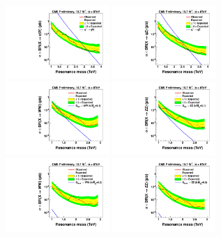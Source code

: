 \begin{figure}[h!tpb]
\begin{center}
\includegraphics[width=0.35\textwidth]{figs/limits/brazilianFlag_qW_combined.pdf}
\includegraphics[width=0.35\textwidth]{figs/limits/brazilianFlag_qZ_combined.pdf}\\
\includegraphics[width=0.35\textwidth]{figs/limits/brazilianFlag_RS1WW_combined.pdf}
\includegraphics[width=0.35\textwidth]{figs/limits/brazilianFlag_RS1ZZ_combined.pdf}\\
\includegraphics[width=0.35\textwidth]{figs/limits/brazilianFlag_BulkWW_combined.pdf}
\includegraphics[width=0.35\textwidth]{figs/limits/brazilianFlag_BulkZZ_combined.pdf}\\

\end{center}
\end{figure}
